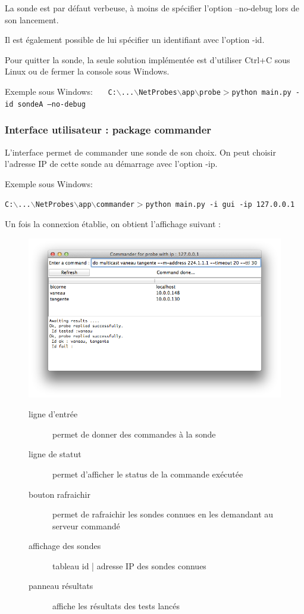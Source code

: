 \documentclass[a4paper,11pt]{article}
\begin{document}
La sonde est par défaut verbeuse, à moins de spécifier l'option --no-debug lors de son lancement.

Il est également possible de lui spécifier un identifiant avec l'option -id.

Pour quitter la sonde, la seule solution implémentée est d'utiliser Ctrl+C sous Linux ou de fermer la console sous Windows.

Exemple sous Windows: \ \ \ \texttt{{\color{blue}C:$\backslash$...$\backslash$NetProbes$\backslash$app$\backslash$probe$>$}python main.py -id sondeA ---no-debug}

\subsubsection{Interface utilisateur : package commander}
L'interface permet de commander une sonde de son choix. On peut choisir l'adresse IP de cette sonde au démarrage avec l'option -ip.

Exemple sous Windows:
\begin{center}
\texttt{{\color{blue}C:$\backslash$...$\backslash$NetProbes$\backslash$app$\backslash$commander$>$}python main.py -i gui -ip 127.0.0.1}
\end{center} 
Un fois la connexion établie, on obtient l'affichage suivant :

\begin{figure}[!ht]
\begin{minipage}[c]{0.5\linewidth}
\centering\includegraphics[width=\linewidth]{img/commander.png}
\end{minipage}
\hfill
\begin{minipage}[c]{0.5\linewidth}
\begin{description}
\item[ligne d'entrée] permet de donner des commandes à la sonde
\item[ligne de statut] permet d'afficher le status de la commande exécutée
\item[bouton rafraichir] permet de rafraichir les sondes connues en les demandant au serveur commandé
\item[affichage des sondes] tableau id | adresse IP des sondes connues
\item[panneau résultats] affiche les résultats des tests lancés
\end{description}
\end{minipage}
\end{figure}
\FloatBarrier
\end{document}
